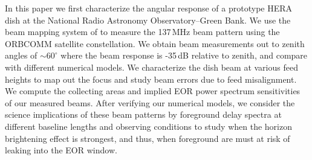 \documentclass{emulateapj}
\begin{document}

In this paper we first characterize the angular response of a prototype HERA dish at the National Radio 
Astronomy Observatory--Green Bank. We use the beam mapping system of \citet{neben15} to 
measure the 137\,MHz beam pattern using the ORBCOMM satellite constellation. We obtain beam 
measurements out to zenith angles of $\sim60^\circ$ where the beam response is -35\,dB relative to zenith, and compare with different numerical models. We characterize the dish beam at various feed heights to map out the focus and study beam errors due to feed misalignment. We compute the collecting areas and implied EOR power spectrum sensitivities of our measured beams. After verifying our numerical models, we consider the science implications of these 
beam patterns by foreground delay spectra at different baseline lengths and observing conditions to study when the horizon brightening effect is strongest, and thus, when foreground are must at risk of leaking into the EOR window.
\end{document}
